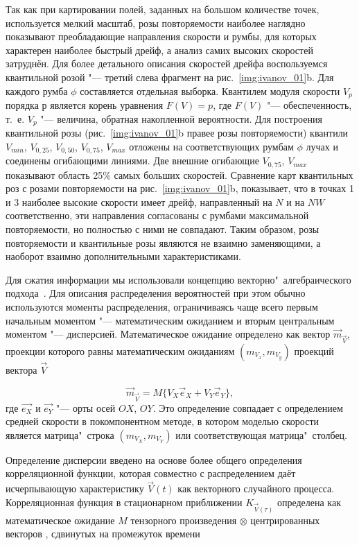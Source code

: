 Так как при картировании полей, заданных на большом количестве точек, используется мелкий масштаб, розы повторяемости наиболее наглядно показывают   преобладающие направления скорости и румбы, для которых характерен наиболее быстрый дрейф, а анализ самих высоких скоростей затруднён. Для более детального описания скоростей дрейфа воспользуемся квантильной розой "--- третий слева фрагмент на рис.~\ref{img:ivanov_01}b. Для каждого румба $\phi$ составляется отдельная выборка. Квантилем модуля скорости $V_p$ порядка $р$ является корень уравнения $F(V)=p$, где $F(V)$ "--- обеспеченность, т.~е. $V_p$ "--- величина, обратная накопленной вероятности. Для построения квантильной розы (рис.~\ref{img:ivanov_01}b правее розы повторяемости) квантили $V_{min}$, $V_{0,25}$, $V_{0,50}$, $V_{0,75}$, $V_{max}$  отложены на соответствующих румбам $\phi$ лучах и соединены огибающими линиями. Две внешние огибающие $V_{0,75}$, $V_{max}$ показывают область 25$\%$ самых больших скоростей. Сравнение карт квантильных роз с розами повторяемости на рис.~\ref{img:ivanov_01}b, показывает, что в точках 1 и 3 наиболее высокие скорости имеет дрейф,  направленный на $N$ и на $NW$ соответственно, эти направления согласованы с румбами максимальной повторяемости, но полностью с ними не совпадают. Таким образом, розы повторяемости и квантильные розы являются не взаимно заменяющими, а наоборот взаимно дополнительными характеристиками.

Для сжатия информации мы использовали концепцию векторно"~алгебраического подхода~\cite{Belyshev1983}. Для описания распределения вероятностей при этом обычно используются моменты распределения, ограничиваясь чаще всего первым начальным моментом "--- математическим ожиданием и вторым центральным моментом "--- дисперсией. Математическое ожидание определено как вектор $\vec{m}_{\vec{V}}$, проекции которого равны математическим ожиданиям $(m_{V_x},m_{V_y})$ проекций вектора $\vec{V}$

\begin{equation}
\label{eq:equation3_2}
\vec{m}_{\vec{V}}=M\{V_X\vec{e}_X+V_Y\vec{e}_Y\},
\end{equation}
где $\vec{e_X}$ и $\vec{e_Y}$ "--- орты осей $OX$, $OY$. Это определение совпадает с определением средней скорости в покомпонентном методе, в котором моделью скорости является матрица"~строка $(m_{V_X},m_{V_Y})$ или соответствующая матрица"~столбец.

Определение дисперсии введено на основе более общего определения корреляционной функции, которая совместно с распределением  даёт исчерпывающую характеристику $\vec{V}(t)$ как векторного случайного процесса. Корреляционная функция в стационарном приближении $K_{\vec{V}(\tau)}$ определена как математическое ожидание $M$ тензорного произведения $\otimes$ центрированных векторов  , сдвинутых на промежуток времени  

